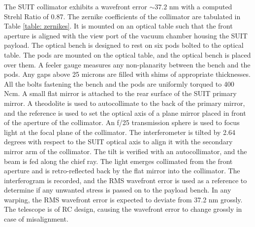 \documentclass[12pt]{spieman}  %
\begin{document}
The SUIT collimator exhibits a wavefront error $\sim 37.2$ nm with a computed Strehl Ratio of 0.87. The zernike coefficients of the collimator are tabulated in Table \ref{table: zernikes}.
It is mounted on an optical table such that the front aperture is aligned with the view port of the vacuum chamber housing the SUIT payload. The optical bench is designed to rest on six pods bolted to the optical table. The pods are mounted on the optical table, and the optical bench is placed over them. A feeler gauge measures any non-planarity between the bench and the pods. Any gaps above 25 microns are filled with shims of appropriate thicknesses. All the bolts fastening the bench and the pods are uniformly torqued to 400 Ncm. A small flat mirror is attached to the rear surface of the SUIT primary mirror. A theodolite is used to autocollimate to the back of the primary mirror, and the reference is used to set the optical axis of a plane mirror placed in front of the aperture of the collimator. An f/25 transmission sphere is used to focus light at the focal plane of the collimator. The interferometer is tilted by 2.64 degrees with respect to the SUIT optical axis to align it with the secondary mirror arm of the collimator. The tilt is verified with an autocollimator, and the beam is fed along the chief ray. The light emerges collimated from the front aperture and is retro-reflected back by the flat mirror into the collimator. The interferogram is recorded, and the RMS wavefront error is used as a reference to determine if any unwanted stress is passed on to the payload bench. In any warping, the RMS wavefront error is expected to deviate from 37.2 nm grossly. The telescope is of RC design, causing the wavefront error to change grossly in case of misalignment.
\end{document}

